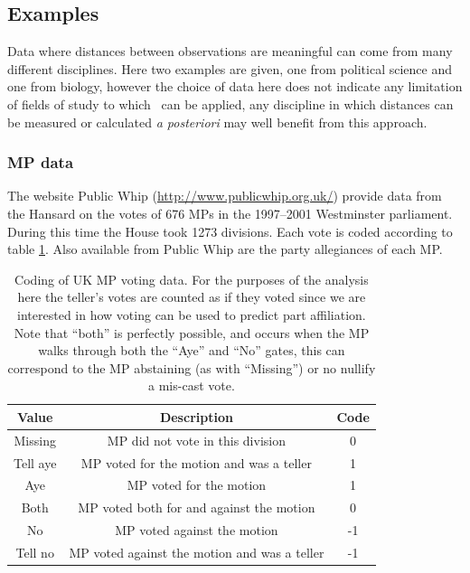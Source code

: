 \subsection{Examples}

Data where distances between observations are meaningful can come from many different disciplines. Here two examples are given, one from political science and one from biology, however the choice of data here does not indicate any limitation of fields of study to which \mdsds\ can be applied, any discipline in which distances can be measured or calculated \textit{a posteriori} may well benefit from this approach.


\subsubsection{MP data}


The website Public Whip (\url{http://www.publicwhip.org.uk/}) provide data from the Hansard on the votes of 676 MPs in the 1997--2001 Westminster parliament. During this time the House took 1273 divisions. Each vote is coded according to table \ref{voting-code}. Also available from Public Whip are the party allegiances of each MP. 

\begin{table}  
\begin{centering}
\begin{tabular}{ccc}
    Value & Description & Code \\ 
    \hline
    Missing & MP did not vote in this division & 0 \\ 
    Tell aye & MP voted for the motion and was a teller & 1 \\ 
    Aye & MP voted for the motion & 1 \\ 
    Both & MP voted both for  and against the motion & 0 \\ 
    No & MP voted against the motion & -1 \\ 
    Tell no & MP voted against the motion and was a teller & -1 \\ 
  \end{tabular}
\caption{Coding of UK MP voting data. For the purposes of the analysis here the teller's votes are counted as if they voted since we are interested in how voting can be used to predict part affiliation. Note that ``both'' is perfectly possible, and occurs when the MP walks through both the ``Aye'' and ``No'' gates, this can correspond to the MP abstaining (as with ``Missing'') or no nullify a mis-cast vote.}
\end{centering}
\label{voting-code}
\end{table}


